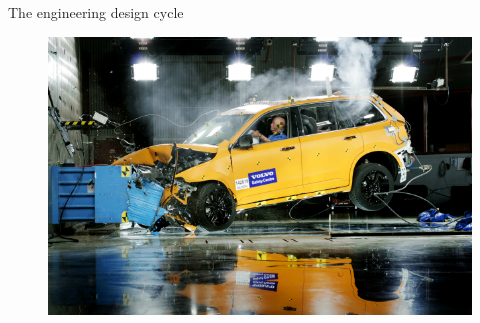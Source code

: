 \documentclass[]{beamer}
\begin{document}
\begin{frame}{The engineering design cycle}
\begin{minipage}{0.55\linewidth}
\begin{figure}
            \centering
            \includegraphics[width=0.99\linewidth]{crash_test.jpg}
        \end{figure}
    \end{minipage}
\end{frame}
\end{document}
